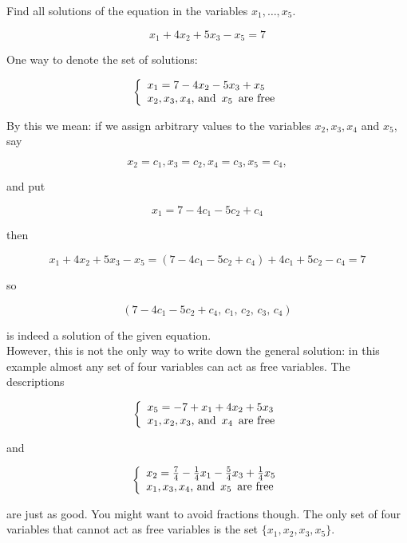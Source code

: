 \begin{ex}
\label{Ex:LinSystems:SystemOfOneEquation}
Find all solutions of the equation in the variables $x_1,\ldots,x_5$.

$$

  x_1 + 4x_2 + 5x_3 - x_5 = 7
$$

One way to denote the set of solutions:

$$

 \left\{
\begin{array}{l}
        x_1 = 7 - 4x_2 -5x_3 + x_5 \\
        x_2, x_3, x_4 \text{, and \,} x_5  \text{\, are free}
        \end{array}
 \right.
$$


By this we mean:  if we assign arbitrary values to the variables $x_2, x_3, x_4$  and $x_5$, say

$$

  x_2 = c_1, x_3 = c_2, x_4 = c_3, x_5 = c_4,
$$

and put

$$

  x_1 = 7 - 4c_1 -5c_2 + c_4
$$

then 

$$

 x_1 + 4x_2 + 5x_3 - x_5 = (7 - 4c_1 -5c_2 + c_4) +
   4c_1 +5c_2 - c_4 = 7
$$

so 

$$

  (7 - 4c_1 -5c_2 + c_4,\,c_1,\,c_2,\,c_3,\,c_4)
$$

is indeed a solution of the given equation. \\
However, this is not the only way to write down the general solution:  in this example almost any set of four variables can act as free variables.  The descriptions 

$$

  \left\{
\begin{array}{l}
        x_5 = -7 +x_1 +4x_2 +5x_3  \\
        x_1, x_2, x_3 \text{, and \,} x_4  \text{\, are free}
        \end{array}
 \right.
$$

and

$$

     \left\{
\begin{array}{l}
        x_2 = \frac74 - \frac14x_1 -\frac54x_3+\frac14x_5  \\
        x_1, x_3, x_4 \text{, and \,} x_5  \text{\, are free}
      \end{array}
    \right.
$$

are just as good.   You might want to avoid fractions though.  The only set of four variables that cannot act as free variables is the set $\{x_1,x_2,x_3,x_5\}$.
\end{ex}




